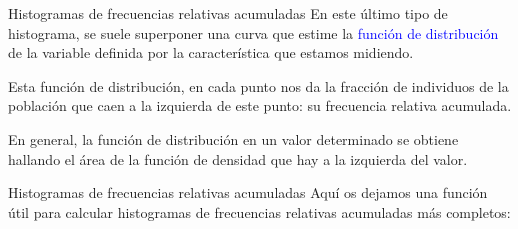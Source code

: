 \documentclass[
  ignorenonframetext,
  aspectratio=169]{beamer}
\newcommand\blue[1]{\textcolor{blue}{#1}}
\begin{document}
\begin{frame}{Histogramas de frecuencias relativas acumuladas}
\label{histogramas-de-frecuencias-relativas-acumuladas}
En este último tipo de histograma, se suele superponer una curva que
estime la \blue{función de distribución} de la variable definida por la
característica que estamos midiendo.

Esta función de distribución, en cada punto nos da la fracción de
individuos de la población que caen a la izquierda de este punto: su
frecuencia relativa acumulada.

En general, la función de distribución en un valor determinado se
obtiene hallando el área de la función de densidad que hay a la
izquierda del valor.
\end{frame}

\begin{frame}[fragile]{Histogramas de frecuencias relativas acumuladas}
\label{histogramas-de-frecuencias-relativas-acumuladas-1}
Aquí os dejamos una función útil para calcular histogramas de
frecuencias relativas acumuladas más completos:


\end{frame}
\end{document}
